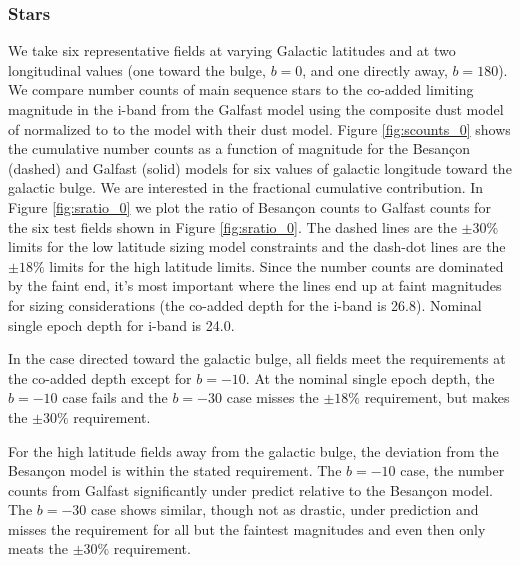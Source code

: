 \documentclass[]{article}
\begin{document}
\subsubsection{Stars}
We take six representative fields at varying Galactic latitudes and at
two longitudinal values (one toward the bulge, $b=0$, and one directly
away, $b=180$).  We compare number counts of main sequence stars to
the co-added limiting magnitude in the i-band from the Galfast model
\citep{XXX} using the composite dust model of \citet{amores05}
normalized to \citet{schlegel98} to the \citet{besancon} model with
their dust model.  Figure \ref{fig:scounts_0} shows the cumulative
number counts as a function of magnitude for the Besan\c{c}on (dashed)
and Galfast (solid) models for six values of galactic longitude toward
the galactic bulge.  We are interested in the fractional cumulative
contribution.  In Figure \ref{fig:sratio_0} we plot the ratio of
Besan\c{c}on counts to Galfast counts for the six test fields shown in
Figure \ref{fig:sratio_0}.  The dashed lines are the $\pm30\%$ limits
for the low latitude sizing model constraints and the dash-dot lines
are the $\pm18\%$ limits for the high latitude limits.  Since the
number counts are dominated by the faint end, it's most important
where the lines end up at faint magnitudes for sizing considerations
(the co-added depth for the i-band is 26.8).  Nominal single epoch
depth for i-band is 24.0.

In the case directed toward the galactic bulge, all fields meet the
requirements at the co-added depth except for $b=-10$.  At the nominal
single epoch depth, the $b=-10$ case fails and the $b=-30$ case misses
the $\pm18\%$ requirement, but makes the $\pm30\%$ requirement.

For the high latitude fields away from the galactic bulge, the
deviation from the Besan\c{c}on model is within the stated
requirement.  The $b=-10$ case, the number counts from Galfast
significantly under predict relative to the Besan\c{c}on model.  The
$b=-30$ case shows similar, though not as drastic, under prediction
and misses the requirement for all but the faintest magnitudes and
even then only meats the $\pm30\%$ requirement.

\end{document}
